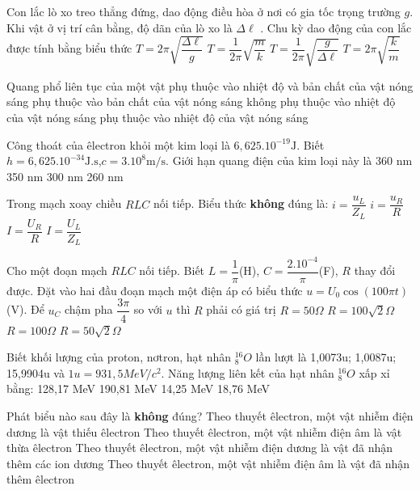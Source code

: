 \documentclass[11pt,a4paper]{book}
\begin{document}
\begin{ex} 
Con lắc lò xo treo thẳng đứng, dao động điều hòa ở nơi có gia tốc trọng trường $g$. Khi vật ở vị trí cân bằng, độ dãn của lò xo là $\Delta \ell $  . Chu kỳ dao động của con lắc được tính bằng biểu thức
\choice 
{ $T=2\pi \sqrt{\dfrac{\Delta \ell }{g}}$ }
{  $T=\dfrac{1}{2\pi }\sqrt{\dfrac{m}{k}}$}
{ $T=\dfrac{1}{2\pi }\sqrt{\dfrac{g}{\Delta \ell }}$ }
{ $T=2\pi \sqrt{\dfrac{k}{m}}$  } \end{ex} 
\begin{ex} 
Quang phổ liên tục của một vật
\choice 
{ phụ thuộc vào nhiệt độ và bản chất của vật nóng sáng} 
{ phụ thuộc vào bản chất của vật nóng sáng} 
{ không phụ thuộc vào nhiệt độ của vật nóng sáng} 
{ phụ thuộc vào nhiệt độ của vật nóng sáng} \end{ex} 
\begin{ex} 
Công thoát của êlectron khỏi một kim loại là ${{6,625.10}^{-19}}\text{J}$. Biết $h={{6,625.10}^{-34}}\text{J}\text{.s}$,$c={{3.10}^{8}}\text{m/s}$. Giới hạn quang điện của kim loại này là
\choice 
{ 360 nm}
{ 350 nm}
{ 300 nm}
{ 260 nm} \end{ex} 
\begin{ex} 
Trong mạch xoay chiều $RLC$ nối tiếp. Biểu thức \textbf{không} đúng là:
\choice 
{ $i=\dfrac{{{u}_{L}}}{{{Z}_{L}}}$}
{ $i=\dfrac{{{u}_{R}}}{R}$}
{ $I=\dfrac{{{U}_{R}}}{R}$}
{ $I=\dfrac{{{U}_{L}}}{{{Z}_{L}}}$} \end{ex} 
\begin{ex} 
Cho một đoạn mạch $RLC$ nối tiếp. Biết $L=\dfrac{1}{\pi }$(H), $C=\dfrac{{{2.10}^{-4}}}{\pi }$(F), $R$ thay đổi được. Đặt vào hai đầu đoạn mạch một điện áp có biểu thức $u={{U}_0}\cos (100\pi t)$(V). Để $u_{C}$ chậm pha $\dfrac{3\pi }{4}$ so với $u$ thì $R$ phải có giá trị
\choice 
{ $R=50\Omega $}
{ $R=100\sqrt{2}\Omega $}
{ $R=100\Omega $}
{ $R=50\sqrt{2}\Omega $} \end{ex} 
\begin{ex} 
Biết khối lượng của proton, nơtron, hạt nhân $_{8}^{16}O$ lần lượt là 1,0073u; 1,0087u; 15,9904u và $1u=931,5MeV/{{c}^2}$. Năng lượng liên kết của hạt nhân $_{8}^{16}O$ xấp xỉ bằng:
\choice 
{ 128,17 MeV}
{ 190,81 MeV}
{ 14,25 MeV}
{ 18,76 MeV} \end{ex} 
\begin{ex} 
Phát biểu nào sau đây là \textbf{ không} đúng?
\choice 
{ Theo thuyết êlectron, một vật nhiễm điện dương là vật thiếu êlectron} 
{ Theo thuyết êlectron, một vật nhiễm điện âm là vật thừa êlectron} 
{ Theo thuyết êlectron, một vật nhiễm điện dương là vật đã nhận thêm các ion dương} 
{ Theo thuyết êlectron, một vật nhiễm điện âm là vật đã nhận thêm êlectron} \end{ex} 
\end{document}
